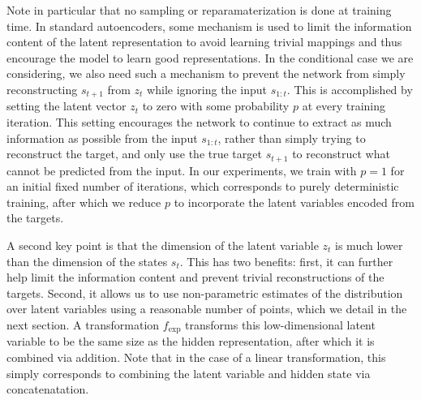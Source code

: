 \documentclass{article}
\begin{document}
Note in particular that no sampling or reparamaterization is done at training time.
In standard autoencoders, some mechanism is used to limit the information content of the latent representation to avoid learning trivial mappings and thus encourage the model to learn good representations.
In the conditional case we are considering, we also need such a mechanism to prevent the network from simply reconstructing $s_{t+1}$ from $z_t$ while ignoring the input $s_{1:t}$.
This is accomplished by setting the latent vector $z_t$ to zero with some probability $p$ at every training iteration.
This setting encourages the network to continue to extract as much information as possible from the input $s_{1:t}$, rather than simply trying to reconstruct the target, and only use the true target $s_{t+1}$ to reconstruct what cannot be predicted from the input.
In our experiments, we train with $p=1$ for an initial fixed number of iterations, which corresponds to purely deterministic training, after which we reduce $p$ to incorporate the latent variables encoded from the targets.

A second key point is that the dimension of the latent variable $z_t$ is much lower than the dimension of the states $s_t$.
This has two benefits: first, it can further help limit the information content and prevent trivial reconstructions of the targets.
Second, it allows us to use non-parametric estimates of the distribution over latent variables using a reasonable number of points, which we detail in the next section.
A transformation $f_\text{exp}$ transforms this low-dimensional latent variable to be the same size as the hidden representation, after which it is combined via addition.
Note that in the case of a linear transformation, this simply corresponds to combining the latent variable and hidden state via concatenatation.

\end{document}
